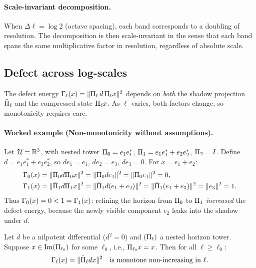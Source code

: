 \paragraph{Scale-invariant decomposition.}
When $\Delta\ell = \log 2$ (octave spacing), each band corresponds to a doubling of resolution.
The decomposition is then scale-invariant in the sense that each band spans the same multiplicative factor in resolution, regardless of absolute scale.

\subsection{Defect across log-scales}

The defect energy $\Gamma_{\ell}(x) = \|\bar{\Pi}_{\ell}\, d \,\Pi_{\ell} x\|^2$ depends on \emph{both} the shadow projection $\bar{\Pi}_{\ell}$ and the compressed state $\Pi_{\ell} x$.
As $\ell$ varies, both factors change, so monotonicity requires care.

\paragraph{Worked example (Non-monotonicity without assumptions).}
\label{ex:defect-nonmonotone}
Let $\mathcal{H} = \mathbb{R}^3$, with nested tower $\Pi_{0} = e_1 e_1^*$, $\Pi_{1} = e_1 e_1^* + e_2 e_2^*$, $\Pi_{2} = I$.
Define $d = e_1 e_1^* + e_3 e_2^*$, so $d e_1 = e_1$, $d e_2 = e_3$, $d e_3 = 0$.
For $x = e_1 + e_2$:
\begin{align*}
\Gamma_{0}(x) &= \|\bar{\Pi}_{0} d \Pi_{0} x\|^2 = \|\bar{\Pi}_{0} d e_1\|^2 = \|\bar{\Pi}_{0} e_1\|^2 = 0, \\
\Gamma_{1}(x) &= \|\bar{\Pi}_{1} d \Pi_{1} x\|^2 = \|\bar{\Pi}_{1} d(e_1 + e_2)\|^2 = \|\bar{\Pi}_{1} (e_1 + e_3)\|^2 = \|e_3\|^2 = 1.
\end{align*}
Thus $\Gamma_{0}(x) = 0 < 1 = \Gamma_{1}(x)$: refining the horizon from $\Pi_{0}$ to $\Pi_{1}$ \emph{increased} the defect energy, because the newly visible component $e_2$ leaks into the shadow under $d$.

\begin{proposition}
\label{prop:log-defect}
Let $d$ be a nilpotent differential ($d^2 = 0$) and $(\Pi_{\ell})$ a nested horizon tower.
Suppose $x \in \mathrm{Im}(\Pi_{\ell_0})$ for some $\ell_0$, i.e., $\Pi_{\ell_0} x = x$.
Then for all $\ell \ge \ell_0$:
\[
\Gamma_{\ell}(x) = \|\bar{\Pi}_{\ell} d x\|^2 \quad\text{is monotone non-increasing in } \ell.
\]
\end{proposition}


